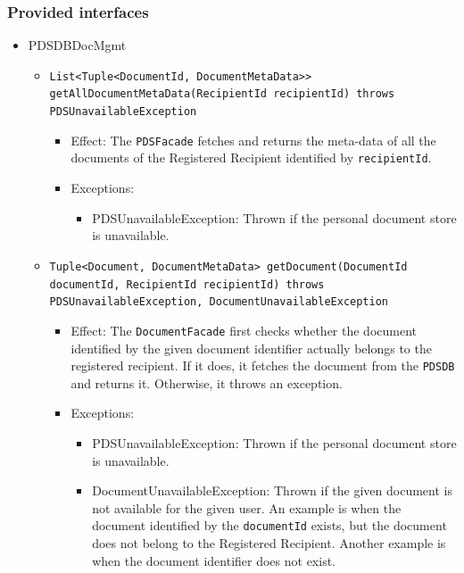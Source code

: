 \documentclass[a4paper,10pt]{article}
\begin{document}
\subsubsection*{Provided interfaces}
\begin{itemize}
    \item PDSDBDocMgmt
    \begin{itemize}
    
        \item \texttt{List<Tuple<DocumentId, DocumentMetaData>> getAllDocumentMetaData(RecipientId recipientId) throws PDSUnavailableException}
        \begin{itemize}
            \item Effect: The \texttt{PDSFacade} fetches and returns the meta-data of all the documents of the Registered Recipient identified by \texttt{recipientId}.
            \item Exceptions:
            \begin{itemize}
                \item PDSUnavailableException: Thrown if the personal document store is unavailable.
            \end{itemize}
		\end{itemize}
	
        \item \texttt{Tuple<Document, DocumentMetaData> getDocument(DocumentId documentId, RecipientId recipientId) throws PDSUnavailableException, DocumentUnavailableException}
        \begin{itemize}
             \item Effect: The \texttt{DocumentFacade} first checks whether the document identified by the given document identifier actually belongs to the registered recipient. If it does, it fetches the document from the \texttt{PDSDB} and returns it. Otherwise, it throws an exception.
             \item Exceptions:
             \begin{itemize}
                \item PDSUnavailableException: Thrown if the personal document store is unavailable.
                \item DocumentUnavailableException: Thrown if the given document is not available for the given user. An example is when the document identified by the \texttt{documentId} exists, but the document does not belong to the Registered Recipient. Another example is when the document identifier does not exist.
            \end{itemize}
        \end{itemize}
     

\end{itemize}
\end{itemize}
\end{document}
